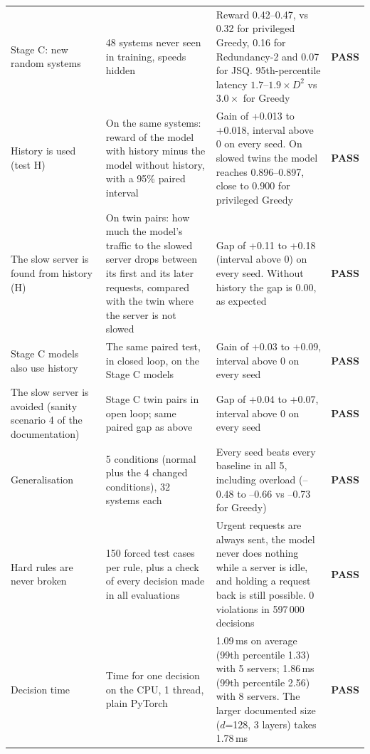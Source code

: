 \documentclass[10pt,a4paper]{article}
\newcommand{\pass}{{\sffamily\bfseries\color{acc}PASS}}
\begin{document}
\begin{xltabular}{\textwidth}{@{}P{3.3cm}LL C@{}}
Stage C: new random systems & 48 systems never seen in training, speeds hidden & Reward 0.42--0.47, vs 0.32 for privileged Greedy, 0.16 for Redundancy-2 and 0.07 for JSQ. 95th-percentile latency $1.7$--$1.9\times D^2$ vs $3.0\times$ for Greedy & \pass\\
History is used (test H) & On the same systems: reward of the model with history minus the model without history, with a 95\% paired interval & Gain of +0.013 to +0.018, interval above 0 on every seed. On slowed twins the model reaches 0.896--0.897, close to 0.900 for privileged Greedy & \pass\\
The slow server is found from history (H) & On twin pairs: how much the model's traffic to the slowed server drops between its first and its later requests, compared with the twin where the server is not slowed & Gap of +0.11 to +0.18 (interval above 0) on every seed. Without history the gap is 0.00, as expected & \pass\\
Stage C models also use history & The same paired test, in closed loop, on the Stage C models & Gain of +0.03 to +0.09, interval above 0 on every seed & \pass\\
The slow server is avoided (sanity scenario 4 of the documentation) & Stage C twin pairs in open loop; same paired gap as above & Gap of +0.04 to +0.07, interval above 0 on every seed & \pass\\
Generalisation & 5 conditions (normal plus the 4 changed conditions), 32 systems each & Every seed beats every baseline in all 5, including overload (--0.48 to --0.66 vs --0.73 for Greedy) & \pass\\
Hard rules are never broken & 150 forced test cases per rule, plus a check of every decision made in all evaluations & Urgent requests are always sent, the model never does nothing while a server is idle, and holding a request back is still possible. 0 violations in 597\,000 decisions & \pass\\
Decision time & Time for one decision on the CPU, 1 thread, plain PyTorch & 1.09\,ms on average (99th percentile 1.33) with 5 servers; 1.86\,ms (99th percentile 2.56) with 8 servers. The larger documented size ($d$=128, 3 layers) takes 1.78\,ms & \pass\\
\bottomrule
\end{xltabular}
\endgroup
\end{document}
